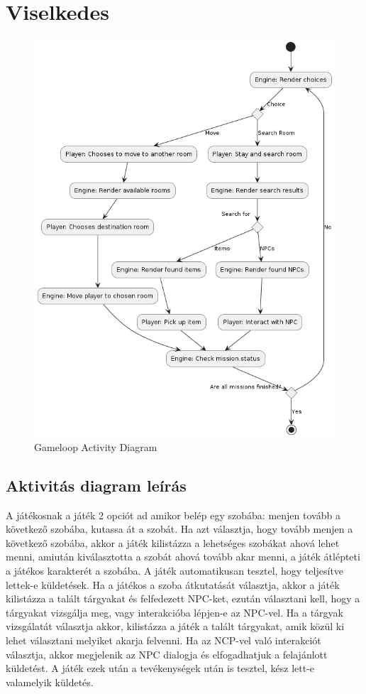\documentclass{scrarticle}
\begin{document}
\section{Viselkedes}
\begin{figure}[H]
    \includegraphics[width=1.0\columnwidth]{GameLoop_ActivityDiagram.png}
    \caption{Gameloop Activity Diagram}\label{fig:5}
\end{figure}
\subsection{Aktivitás diagram leírás}
A játékosnak a játék 2 opciót ad amikor belép egy szobába: menjen tovább a következő szobába, kutassa át a szobát. Ha azt választja, hogy tovább menjen a következő szobába, akkor a játék kilistázza a lehetséges szobákat ahová lehet menni, amiután kiválasztotta a szobát ahová tovább akar menni, a játék átlépteti a játékos karakterét a szobába. A játék automatikusan tesztel, hogy teljesítve lettek-e küldetések. Ha a játékos a szoba átkutatását választja, akkor a játék kilistázza a talált tárgyakat és felfedezett NPC-ket, ezután választani kell, hogy a tárgyakat vizsgálja meg, vagy interakcióba lépjen-e az NPC-vel. Ha a tárgyak vizsgálatát választja akkor, kilistázza a játék a talált tárgyakat, amik közül ki lehet választani melyiket akarja felvenni. Ha az NCP-vel való interakciót választja, akkor megjelenik az NPC dialogja és elfogadhatjuk a felajánlott küldetést. A játék ezek után a tevékenységek után is tesztel, kész lett-e valamelyik küldetés.
\end{document}
